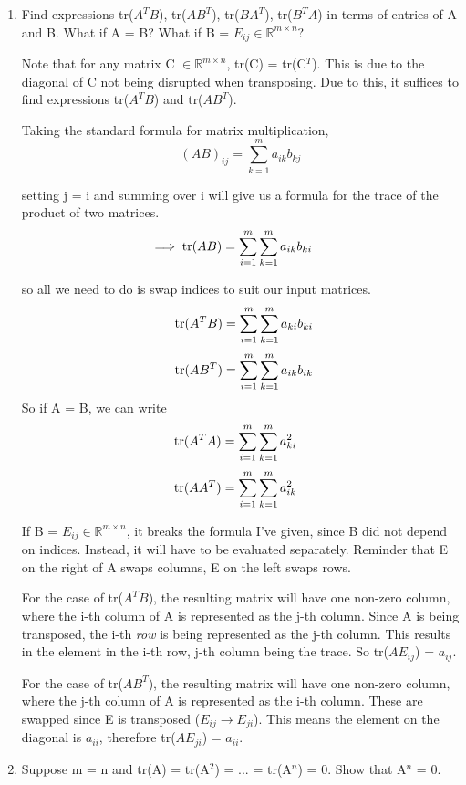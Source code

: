 \documentclass[12pt]{article}
\newcommand{\hop}{\vspace{1mm}}
\newcommand{\jump}{\vspace{5mm}}
\newcommand{\R}{\mathbb{R}}
\begin{document}
\begin{enumerate}[leftmargin=\labelsep]
\begin{enumerate}
\jump
\item Find expressions tr($A^TB$), tr($AB^T$), tr($BA^T$), tr($B^TA$) in terms of entries of A and B. What if A = B? What if B = $E_{ij} \in \R^{m \times n}$?

\hop
Note that for any matrix C $\in \R^{m \times n}$, tr(C) = tr(C$^T$). This is due to the diagonal of C not being disrupted when transposing. Due to this, it suffices to find expressions tr($A^TB$) and tr($AB^T$).

\hop
Taking the standard formula for matrix multiplication,
\[(AB)_{ij} = \sum_{k = 1}^m a_{ik}b_{kj}\]

setting j = i and summing over i will give us a formula for the trace of the product of two matrices.
\[
\hspace{-5mm}\implies \text{tr}(AB) = \sum_{i = 1}^m \sum_{k = 1}^m a_{ik}b_{ki}
\]

so all we need to do is swap indices to suit our input matrices.
\[
\hspace{2mm} \text{tr}(A^TB) = \sum_{i = 1}^m\sum_{k = 1}^m a_{ki}b_{ki}
\]
\[
\hspace{2mm} \text{tr}(AB^T) = \sum_{i = 1}^m\sum_{k = 1}^m a_{ik}b_{ik}
\]
So if A = B, we can write
\[
\hspace{-3mm} \text{tr}(A^TA) = \sum_{i = 1}^m\sum_{k = 1}^m a_{ki}^2
\]
\[
\hspace{-3mm} \text{tr}(AA^T) = \sum_{i = 1}^m\sum_{k = 1}^m a_{ik}^2
\]

\hop
If B = $E_{ij} \in \R^{m \times n}$, it breaks the formula I've given, since B did not depend on indices. Instead, it will have to be evaluated separately. Reminder that E on the right of A swaps columns, E on the left swaps rows. 

\jump
For the case of tr($A^TB$), the resulting matrix will have one non-zero column, where the i-th column of A is represented as the j-th column. Since A is being transposed, the i-th \textit{row} is being represented as the j-th column. This results in the element in the i-th row, j-th column being the trace. So tr($AE_{ij}$) = $a_{ij}$.

\jump
For the case of tr($AB^T$), the resulting matrix will have one non-zero column, where the j-th column of A is represented as the i-th column. These are swapped since E is transposed ($E_{ij} \rightarrow E_{ji}$). This means the element on the diagonal is $a_{ii}$, therefore tr($AE_{ji}$) = $a_{ii}$. 

\item Suppose m = n and tr(A) = tr(A$^2$) = ... = tr(A$^n$) = 0. Show that A$^n$ = 0.


\end{enumerate}
\end{enumerate}
\end{document}
